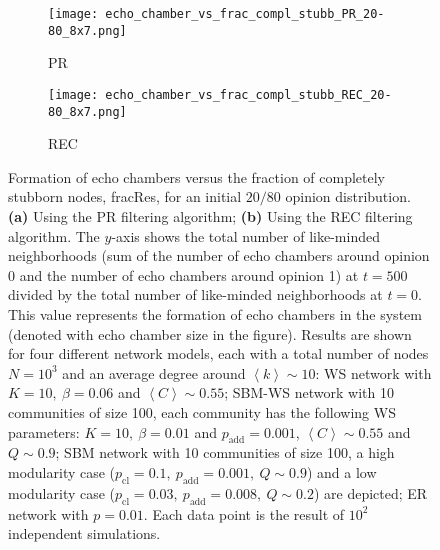 \documentclass[11 pt , letterpaper , twoside , openright]{book}
\begin{document}
\begin{figure}[H]
  \begin{subfigure}[b]{0.49\textwidth}
  	\texttt{[image: echo\_chamber\_vs\_frac\_compl\_stubb\_PR\_20-80\_8x7.png]}
    \caption{PR}
    \label{PR_frac_compl_stubb_20-80}
  \end{subfigure}
  \begin{subfigure}[b]{0.49\textwidth}
  	\texttt{[image: echo\_chamber\_vs\_frac\_compl\_stubb\_REC\_20-80\_8x7.png]}
    \caption{REC}
    \label{REC_frac_compl_stubb_20-80}
  \end{subfigure}
  \captionsetup{format=plain}
  \caption[Formation of echo chambers versus fraction of completely stubborn nodes for the PR and REC filtering algorithms and an initial $20/80$ opinion distribution.]{Formation of echo chambers versus the fraction of completely stubborn nodes, fracRes, for an initial $20/80$ opinion distribution. \textbf{(a)} Using the PR filtering algorithm; \textbf{(b)} Using the REC filtering algorithm. The $y$-axis shows the total number of like-minded neighborhoods (sum of the number of echo chambers around opinion 0 and the number of echo chambers around opinion 1) at $t=500$ divided by the total number of like-minded neighborhoods at $t=0$. This value represents the formation of echo chambers in the system (denoted with echo chamber size in the figure). Results are shown for four different network models, each with a total number of nodes $N=10^3$ and an average degree around $\left<k\right> \sim 10$: WS network with $K =10,\ \beta = 0.06$ and $\left<C\right> \sim 0.55$; SBM-WS network with 10 communities of size 100, each community has the following WS parameters: $K = 10,\ \beta = 0.01$ and $p_{\text{add}} = 0.001$, $\left<C\right> \sim 0.55$ and $Q \sim 0.9$; SBM network with 10 communities of size 100, a high modularity case ($p_{\text{cl}} = 0.1,\ p_{\text{add}} = 0.001,\ Q \sim 0.9$) and a low modularity case ($p_{\text{cl}} = 0.03,\ p_{\text{add}} = 0.008,\ Q \sim 0.2$) are depicted; ER network with $p= 0.01$. Each data point is the result of $10^2$ independent simulations.}
\label{echo_vs_frac_complStubb_PR-REC_20-80}
\end{figure}
\noindent
\end{document}
